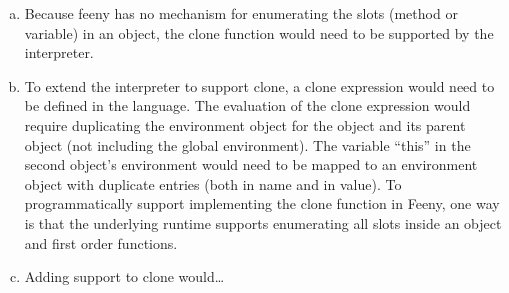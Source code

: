 \documentclass[notitlepage]{report}
\begin{document}
\begin{enumerate}
\begin{enumerate}[(a)]
			\item Because feeny has no mechanism for enumerating the slots (method or variable) in an object, the clone function would need to be supported by the interpreter.
			\item To extend the interpreter to support clone, a clone expression would need to be defined in the language.  The evaluation of the clone expression would require duplicating the environment object for the object and its parent object (not including the global environment).  The variable ``this'' in the second object's environment would need to be mapped to an environment object with duplicate entries (both in name and in value). To programmatically support implementing the clone function in Feeny, one way is that the underlying runtime supports enumerating all slots inside an object and first order functions.
			\item Adding support to clone would\dots
		\end{enumerate}
\end{enumerate}
\end{document}
